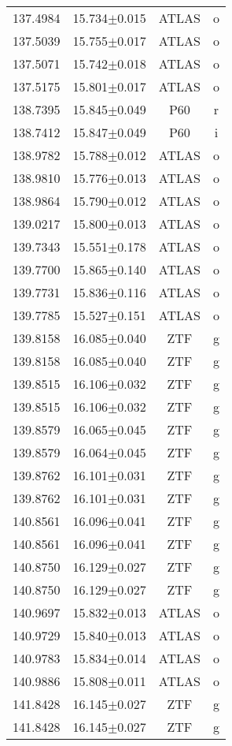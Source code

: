 \begin{table}
\begin{tabular}{cccc}
137.4984 & 15.734$\pm$0.015 & ATLAS & o \\
137.5039 & 15.755$\pm$0.017 & ATLAS & o \\
137.5071 & 15.742$\pm$0.018 & ATLAS & o \\
137.5175 & 15.801$\pm$0.017 & ATLAS & o \\
138.7395 & 15.845$\pm$0.049 & P60 & r \\
138.7412 & 15.847$\pm$0.049 & P60 & i \\
138.9782 & 15.788$\pm$0.012 & ATLAS & o \\
138.9810 & 15.776$\pm$0.013 & ATLAS & o \\
138.9864 & 15.790$\pm$0.012 & ATLAS & o \\
139.0217 & 15.800$\pm$0.013 & ATLAS & o \\
139.7343 & 15.551$\pm$0.178 & ATLAS & o \\
139.7700 & 15.865$\pm$0.140 & ATLAS & o \\
139.7731 & 15.836$\pm$0.116 & ATLAS & o \\
139.7785 & 15.527$\pm$0.151 & ATLAS & o \\
139.8158 & 16.085$\pm$0.040 & ZTF & g \\
139.8158 & 16.085$\pm$0.040 & ZTF & g \\
139.8515 & 16.106$\pm$0.032 & ZTF & g \\
139.8515 & 16.106$\pm$0.032 & ZTF & g \\
139.8579 & 16.065$\pm$0.045 & ZTF & g \\
139.8579 & 16.064$\pm$0.045 & ZTF & g \\
139.8762 & 16.101$\pm$0.031 & ZTF & g \\
139.8762 & 16.101$\pm$0.031 & ZTF & g \\
140.8561 & 16.096$\pm$0.041 & ZTF & g \\
140.8561 & 16.096$\pm$0.041 & ZTF & g \\
140.8750 & 16.129$\pm$0.027 & ZTF & g \\
140.8750 & 16.129$\pm$0.027 & ZTF & g \\
140.9697 & 15.832$\pm$0.013 & ATLAS & o \\
140.9729 & 15.840$\pm$0.013 & ATLAS & o \\
140.9783 & 15.834$\pm$0.014 & ATLAS & o \\
140.9886 & 15.808$\pm$0.011 & ATLAS & o \\
141.8428 & 16.145$\pm$0.027 & ZTF & g \\
141.8428 & 16.145$\pm$0.027 & ZTF & g \\

\end{tabular}
\end{table}
